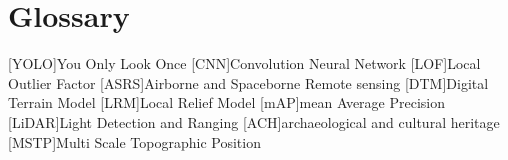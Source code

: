 \chapter{Glossary}

\footnotesize
\SingleSpacing

\begin{multicols}{2}
\begin{acronym}[AAAAAA]

        [YOLO]{You Only Look Once}
	[CNN]{Convolution Neural Network}
	[LOF]{Local Outlier Factor}
        [ASRS]{Airborne and Spaceborne Remote sensing}
        [DTM]{Digital Terrain Model}
        [LRM]{Local Relief Model}
        [mAP]{mean Average Precision}
        [LiDAR]{Light Detection and Ranging}
        [ACH]{archaeological and cultural heritage}
        [MSTP]{Multi Scale Topographic Position}
        
\end{acronym}
\end{multicols}
